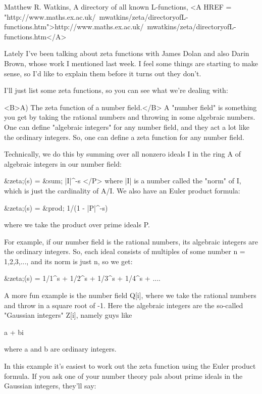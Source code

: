 Matthew R. Watkins, A directory of all known L-functions,
<A HREF = "http://www.maths.ex.ac.uk/~mwatkins/zeta/directoryofL-functions.htm">http://www.maths.ex.ac.uk/~mwatkins/zeta/directoryofL-functions.htm</A>

Lately I've been talking about zeta functions with James Dolan and also 
Darin Brown, whose work I mentioned last week.  I feel some things are 
starting to make sense, so I'd like to explain them before it turns out 
they don't.

I'll just list some zeta functions, so you can see what we're dealing with:

<B>A) The zeta function of a number field.</B>  A "number field" is something you 
get by taking the rational numbers and throwing in some algebraic numbers.   
One can define "algebraic integers" for any number field, and they act a lot 
like the ordinary integers.   So, one can define a zeta function for any 
number field.  

Technically, we do this by summing over all nonzero ideals I in the
ring A of algebraic integers in our number field:

&zeta;(s) = &sum; |I|^{-s}
</P>
where |I| is a number called the "norm" of I, which is 
just the cardinality of A/I.  We also have an Euler product formula:

&zeta;(s) = &prod; 1/(1 - |P|^{-s})

where we take the product over prime ideals P.

For example, if our number field is the rational numbers, its algebraic 
integers are the ordinary integers.  So, each ideal consists of multiples 
of some number n = 1,2,3,..., and its norm is just n, so we get:

&zeta;(s) = 1/1^{s} + 1/2^{s} + 1/3^{s} + 1/4^{s} + ....

A more fun example is the number field Q[i], where we take the
rational numbers and throw in a square root of -1.  Here the
algebraic integers are the so-called "Gaussian integers" Z[i], 
namely guys like

a + bi 

where a and b are ordinary integers.  

In this example it's easiest to work out the zeta function using 
the Euler product formula.  If you ask one of your number theory 
pals about prime ideals in the Gaussian integers, they'll say:

